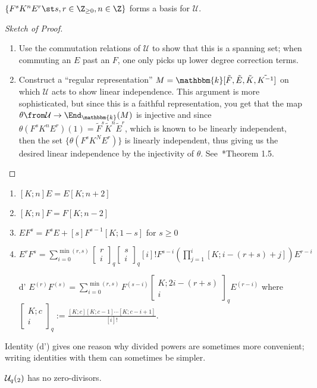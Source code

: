 \documentclass[11pt,leqno,oneside]{amsbook}
\numberwithin{thm}{section}
\newcommand{\U}{\mathcal{U}}
\newcommand{\qbinom}[3][q]{\left[\begin{array}{c}#2\\#3\end{array}\right]_{#1}}
\renewcommand{\k}{\mathbbm{k}}
\begin{document}
\begin{thm}
  \(\{F^sK^nE^r \st s,r \in \Z_{\geq 0}, n \in \Z\}\) forms a basis
  for \(\U\). 
\end{thm}
\begin{proof}[Sketch of Proof]
  \begin{enumerate}
  \item Use the commutation relations of \(\U\) to show that this is a
    spanning set; when commuting an \(E\) past an \(F\), one only
    picks up lower degree correction terms.
  \item Construct a ``regular representation'' \(M =
    \k[\tilde{F},\tilde{E},\tilde{K},\tilde{K^{-1}}]\) on which \(\U\) acts to show linear
    independence. This argument is more sophisticated, but since this
    is a faithful representation, you get that the map \(\theta \from \U
    \to \End_\k(M)\) is injective and since \(\theta(F^sK^nE^r)(1) =
    \tilde{F}^s\tilde{K}^n\tilde{E}^r\), which is known to be linearly
    independent, then the set \(\{\theta(F^s K^N E^r)\}\) is linearly
    independent, thus giving us the desired linear independence by the
    injectivity of \(\theta\). See~\cite{jantzen}*{Theorem 1.5}.
  \end{enumerate}
\end{proof}
\begin{lem}\label{useful-identities}
  \begin{enumerate}
  \item \([K;n]E = E[K;n+2]\)
  \item \([K;n]F = F[K;n-2]\)
  \item \(EF^s = F^s E + [s]F^{s-1}[K;1-s]\) for \(s \geq 0\)
  \item \(E^rF^s = \sum_{i=0}^{\min(r,s)} \qbinom{r}{i}\qbinom{s}{i}
    [i]! F^{s-i}\left( \prod_{j=1}^i [K;i-(r+s)+j] \right)E^{r-i}\)
  \item[d'] \(E^{(r)}F^{(s)} = \sum_{i=0}^{\min(r,s)} F^{(s-i)}
    \qbinom{K;2i-(r+s)}{i} E^{(r-i)}\) where \(\qbinom{K;c}{i} :=
    \frac{[K;c][K;c-1] \cdots [K;c-i+1]}{[i]!}\).
  \end{enumerate}
\end{lem}
Identity (d') gives one reason why divided powers are sometimes more
convenient; writing identities with them can sometimes be simpler.
\begin{rmk}
  \(\U_q(\sl_2)\) has no zero-divisors.
\end{rmk}
\end{document}

